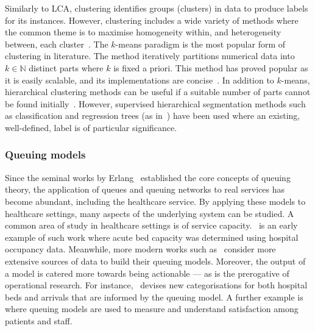 \documentclass[11pt]{article}
\begin{document}
Similarly to LCA, clustering identifies groups (clusters) in data to produce
labels for its instances. However, clustering includes a wide variety of methods
where the common theme is to maximise homogeneity within, and heterogeneity
between, each cluster~\cite{Everitt2011}. The \(k\)-means paradigm is the most
popular form of clustering in literature. The method iteratively partitions
numerical data into \(k \in \mathbb N\) distinct parts where \(k\) is fixed a
priori. This method has proved popular as it is easily scalable, and its
implementations are concise~\cite{Olafsson2008,Wu2009}. In addition to
\(k\)-means, hierarchical clustering methods can be useful if a suitable number
of parts cannot be found initially~\cite{Vuik2016a}. However, supervised
hierarchical segmentation methods such as classification and regression trees
(as in~\cite{Harper2006}) have been used where an existing, well-defined, label
is of particular significance.

\subsubsection{Queuing models}

Since the seminal works by Erlang~\cite{Erlang1917,Erlang1920} established the
core concepts of queuing theory, the application of queues and queuing networks
to real services has become abundant, including the healthcare service. By
applying these models to healthcare settings, many aspects of the underlying
system can be studied. A common area of study in healthcare settings is of
service capacity.~\cite{McClain1976} is an early example of such work where
acute bed capacity was determined using hospital occupancy data. Meanwhile, more
modern works such as~\cite{Palvannan2012,Pinto2014} consider more extensive
sources of data to build their queuing models.  Moreover, the output of a model
is catered more towards being actionable --- as is the prerogative of
operational research. For instance,~\cite{Pinto2014} devises new categorisations
for both hospital beds and arrivals that are informed by the queuing model. A
further example is~\cite{Komashie2015} where queuing models are used to measure
and understand satisfaction among patients and staff.
\end{document}
